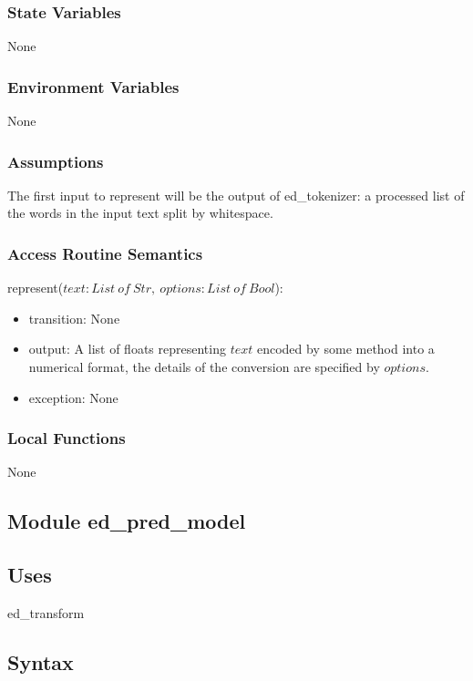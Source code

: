 \documentclass[12pt, titlepage]{article}
\begin{document}
\subsubsection{State Variables}

None

\subsubsection{Environment Variables}

None

\subsubsection{Assumptions}

The first input to represent will be the output of ed\_tokenizer: a processed list of the words in the input text split by whitespace.

\subsubsection{Access Routine Semantics}

\noindent represent($text: List\ of\ Str,\ options: List\ of\ Bool$):
\begin{itemize}
\item transition: None
\item output: A list of floats representing $text$ encoded by some method into a numerical format, the details of the conversion are specified by $options$.
\item exception: None
\end{itemize}

\subsubsection{Local Functions}

None


\subsection{Module ed\_pred\_model}

\subsection{Uses}

ed\_transform

\subsection{Syntax}
\end{document}
